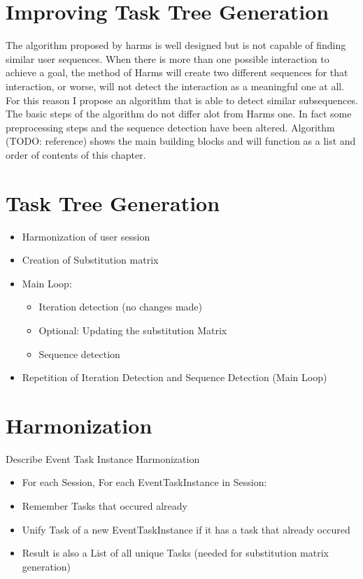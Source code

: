 \section{Improving Task Tree Generation}
The algorithm proposed by harms is well designed but is not capable of finding similar user sequences. 
When there is more than one possible interaction to achieve a goal, the method of Harms will create two different sequences for that interaction, 
or worse, will not detect the interaction as a meaningful one at all. For this reason I propose an algorithm that is able to detect similar subsequences.
The basic steps of the algorithm do not differ alot from Harms one. In fact some preprocessing steps and the sequence detection have been altered.
Algorithm (TODO: reference) shows the main building blocks and will function as a list and order of contents of this chapter.
\section{Task Tree Generation}
	\begin{itemize}
		\item Harmonization of user session
		\item Creation of Substitution matrix
		\item Main Loop:
		\begin{itemize}
			\item Iteration detection (no changes made)
			\item Optional: Updating the substitution Matrix
			\item Sequence detection
		\end{itemize}
		\item Repetition of Iteration Detection and Sequence Detection (Main Loop)
	\end{itemize}

\section{Harmonization}
Describe Event Task Instance Harmonization
\begin{itemize}
	\item For each Session, For each EventTaskInstance in Session:
	\item Remember Tasks that occured already
	\item Unify Task of a new EventTaskInstance if it has a task that already occured
	\item Result is also a List of all unique Tasks (needed for substitution matrix generation)
\end{itemize}

